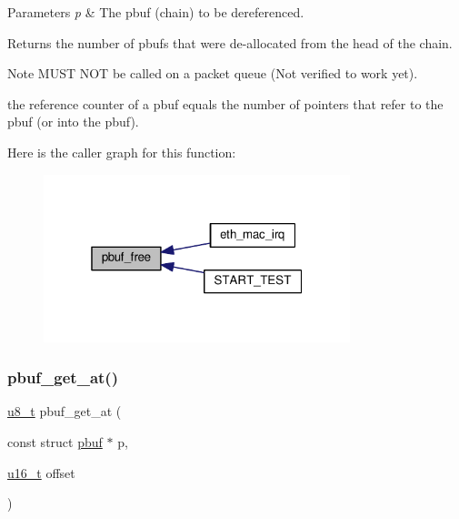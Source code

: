\begin{DoxyParams}{Parameters}
{\em p} & The pbuf (chain) to be dereferenced.\\
\hline
\end{DoxyParams}
\begin{DoxyReturn}{Returns}
the number of pbufs that were de-\/allocated from the head of the chain.
\end{DoxyReturn}
\begin{DoxyNote}{Note}
M\+U\+ST N\+OT be called on a packet queue (Not verified to work yet). 

the reference counter of a pbuf equals the number of pointers that refer to the pbuf (or into the pbuf). 
\end{DoxyNote}
Here is the caller graph for this function\+:
\nopagebreak
\begin{figure}[H]
\begin{center}
\leavevmode
\includegraphics[width=253pt]{group__pbuf_gab0dd696fb4b6bc65e548944584f1738b_icgraph}
\end{center}
\end{figure}
\mbox{\label{group__pbuf_ga6d803d9945bffb7ad97743f2fa503da6}} 
\subsubsection{\texorpdfstring{pbuf\+\_\+get\+\_\+at()}{pbuf\_get\_at()}}
{\footnotesize\ttfamily \hyperlink{group__compiler__abstraction_ga4caecabca98b43919dd11be1c0d4cd8e}{u8\+\_\+t} pbuf\+\_\+get\+\_\+at (\begin{DoxyParamCaption}\item[{const struct \hyperlink{structpbuf}{pbuf} $\ast$}]{p,  }\item[{\hyperlink{group__compiler__abstraction_ga77570ac4fcab86864fa1916e55676da2}{u16\+\_\+t}}]{offset }\end{DoxyParamCaption})}

